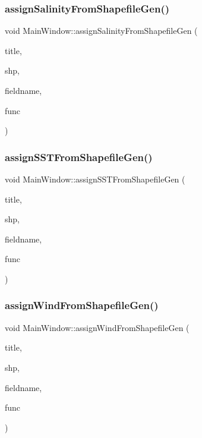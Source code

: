 \subsubsection{\texorpdfstring{assignSalinityFromShapefileGen()}{assignSalinityFromShapefileGen()}}
{\footnotesize\ttfamily void Main\+Window\+::assign\+Salinity\+From\+Shapefile\+Gen (\begin{DoxyParamCaption}\item[{Q\+String}]{title,  }\item[{Q\+String}]{shp,  }\item[{const char $\ast$const}]{fieldname,  }\item[{std\+::function$<$ void(O\+G\+R\+Geometry $\ast$, int)$>$}]{func }\end{DoxyParamCaption})\hspace{0.3cm}{\ttfamily [protected]}}

\mbox{\label{class_main_window_aba1a2210deb88be61d512b0cde8ff597}} 
\subsubsection{\texorpdfstring{assignSSTFromShapefileGen()}{assignSSTFromShapefileGen()}}
{\footnotesize\ttfamily void Main\+Window\+::assign\+S\+S\+T\+From\+Shapefile\+Gen (\begin{DoxyParamCaption}\item[{Q\+String}]{title,  }\item[{Q\+String}]{shp,  }\item[{const char $\ast$const}]{fieldname,  }\item[{std\+::function$<$ void(O\+G\+R\+Geometry $\ast$, int)$>$}]{func }\end{DoxyParamCaption})\hspace{0.3cm}{\ttfamily [protected]}}

\mbox{\label{class_main_window_a782b0c19abe0c9e2ab05403f5d50870e}} 
\subsubsection{\texorpdfstring{assignWindFromShapefileGen()}{assignWindFromShapefileGen()}}
{\footnotesize\ttfamily void Main\+Window\+::assign\+Wind\+From\+Shapefile\+Gen (\begin{DoxyParamCaption}\item[{Q\+String}]{title,  }\item[{Q\+String}]{shp,  }\item[{const char $\ast$const}]{fieldname,  }\item[{std\+::function$<$ void(O\+G\+R\+Geometry $\ast$, int)$>$}]{func }\end{DoxyParamCaption})\hspace{0.3cm}{\ttfamily [protected]}}

